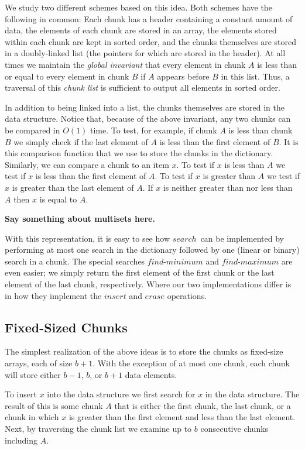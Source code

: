 \documentclass{DIKU-article}
\newcommand{\Search}{\mbox{$\mathit{search}$}}
\newcommand{\Erase}{\mbox{$\mathit{erase}$}}
\newcommand{\Findmin}{\mbox{$\mathit{find}$\textnormal{-}}\allowbreak{}\mbox{$\mathit{minimum}$}}
\newcommand{\Findmax}{\mbox{$\mathit{find}$\textnormal{-}}\allowbreak{}\mbox{$\mathit{maximum}$}}
\newcommand{\Insert}{\mbox{$\mathit{insert}$}}
\begin{document}
We study two different schemes based on this idea.  Both schemes have
the following in common:  Each chunk has a header containing a
constant amount of data, the elements of each chunk are stored in an
array, the elements stored within each chunk are kept in sorted order,
and the chunks themselves are stored in a doubly-linked list (the
pointers for which are stored in the header).  At all times we
maintain the \emph{global invariant} that every element in chunk $A$
is less than or equal to every element in chunk $B$ if $A$ appears
before $B$ in this list.  Thus, a traversal of this \emph{chunk list}
is sufficient to output all elements in sorted order.

In addition to being linked into a list, the chunks themselves are
stored in the data structure.  Notice that, because of the above
invariant, any two chunks can be compared in $O(1)$ time.  To test,
for example, if chunk $A$ is less than chunk $B$ we simply check if
the last element of $A$ is less than the first element of $B$.  It is
this comparison function that we use to store the chunks in the
dictionary.  Similarly, we can compare a chunk to an item $x$.  To
test if $x$ is less than $A$ we test if $x$ is less than the first
element of $A$.  To test if $x$ is greater than $A$ we test if $x$ is
greater than the last element of $A$.  If $x$ is neither greater than
nor less than $A$ then $x$ is equal to $A$.  

\noindent\textbf{Say something about multisets here.}

With this representation, it is easy to see how \Search\ can be
implemented by performing at most one search in the dictionary
followed by one (linear or binary) search in a chunk.  The special
searches  \Findmin{} and \Findmax{} are even easier;  we simply return
the first element of the first chunk or the last element of the last
chunk, respectively.  Where our two implementations differ is in how
they implement the \Insert{} and \Erase{} operations.

\subsection{Fixed-Sized Chunks}

The simplest realization of the above ideas is to store the chunks as
fixed-size arrays, each of size $b+1$.  With the exception of at most
one chunk, each chunk will store either $b-1$, $b$, or $b+1$ data
elements.

To insert $x$ into the data structure we first search for $x$ in the
data structure.  The result of this is some chunk $A$ that is either
the first chunk, the last chunk, or a chunk in which $x$ is greater
than the first element and less than the last element.  Next, by
traversing the chunk list we examine up to $b$ consecutive chunks
including $A$.
\end{document}
